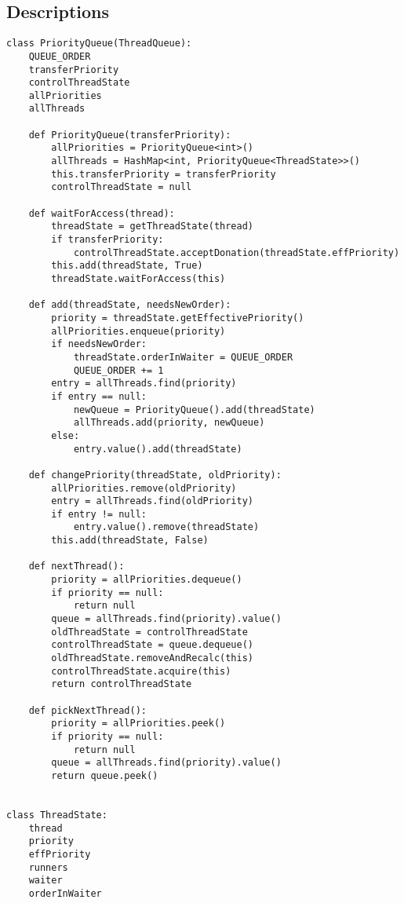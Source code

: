 \documentclass[11pt]{article}
\begin{document}
\subsection{Descriptions} %
\scriptsize
\begin{lstlisting}[frame=single]
class PriorityQueue(ThreadQueue):
    QUEUE_ORDER
    transferPriority
    controlThreadState
    allPriorities
    allThreads
    
    def PriorityQueue(transferPriority):
        allPriorities = PriorityQueue<int>()
        allThreads = HashMap<int, PriorityQueue<ThreadState>>()
        this.transferPriority = transferPriority
        controlThreadState = null
        
    def waitForAccess(thread):
        threadState = getThreadState(thread)
        if transferPriority:
            controlThreadState.acceptDonation(threadState.effPriority)
        this.add(threadState, True)
        threadState.waitForAccess(this)
    
    def add(threadState, needsNewOrder):
        priority = threadState.getEffectivePriority()
        allPriorities.enqueue(priority)
        if needsNewOrder:
            threadState.orderInWaiter = QUEUE_ORDER
            QUEUE_ORDER += 1
        entry = allThreads.find(priority)
        if entry == null:
            newQueue = PriorityQueue().add(threadState)
            allThreads.add(priority, newQueue)
        else:
            entry.value().add(threadState)
    
    def changePriority(threadState, oldPriority):
        allPriorities.remove(oldPriority)
        entry = allThreads.find(oldPriority)
        if entry != null:
            entry.value().remove(threadState)
        this.add(threadState, False)
    
    def nextThread():
        priority = allPriorities.dequeue()
        if priority == null:
            return null
        queue = allThreads.find(priority).value()
        oldThreadState = controlThreadState
        controlThreadState = queue.dequeue()
        oldThreadState.removeAndRecalc(this)
        controlThreadState.acquire(this)
        return controlThreadState
        
    def pickNextThread():
        priority = allPriorities.peek()
        if priority == null:
            return null
        queue = allThreads.find(priority).value()
        return queue.peek()
    
    
class ThreadState:
    thread
    priority
    effPriority
    runners
    waiter
    orderInWaiter
    

\end{lstlisting}
\end{document}
